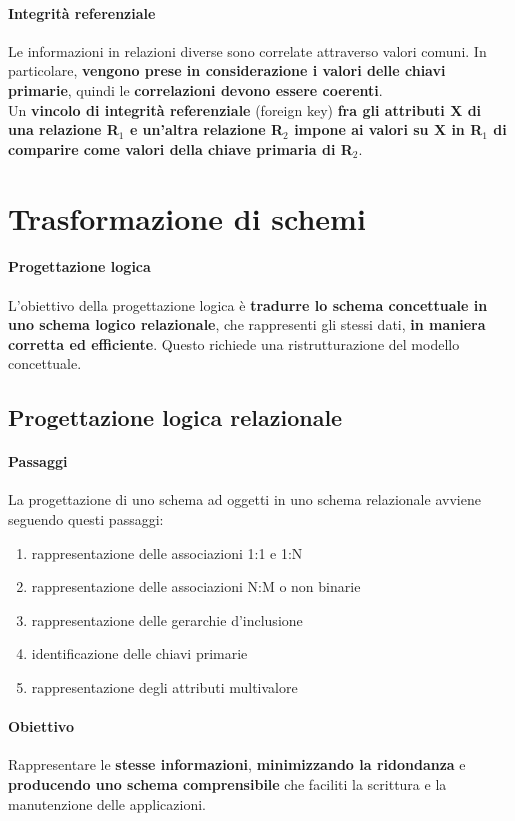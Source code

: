 \documentclass[10pt]{book}
\begin{document}
\paragraph{Integrità referenziale} Le informazioni in relazioni diverse sono correlate attraverso valori comuni. In particolare, \textbf{vengono prese in considerazione i valori delle chiavi primarie}, quindi le \textbf{correlazioni devono essere coerenti}.\\
Un \textbf{vincolo di integrità referenziale} (foreign key) \textbf{fra gli attributi X di una relazione R$_1$ e un'altra relazione R$_2$ impone ai valori su X in R$_1$ di comparire come valori della chiave primaria di R$_2$}.
\section{Trasformazione di schemi}
\paragraph{Progettazione logica} L'obiettivo della progettazione logica è \textbf{tradurre lo schema concettuale in uno schema logico relazionale}, che rappresenti gli stessi dati, \textbf{in maniera corretta ed efficiente}. Questo richiede una ristrutturazione del modello concettuale.
\subsection{Progettazione logica relazionale}
\paragraph{Passaggi} La progettazione di uno schema ad oggetti in uno schema relazionale avviene seguendo questi passaggi:
\begin{enumerate}
	\item rappresentazione delle associazioni 1:1 e 1:N
	\item rappresentazione delle associazioni N:M o non binarie
	\item rappresentazione delle gerarchie d'inclusione
	\item identificazione delle chiavi primarie
	\item rappresentazione degli attributi multivalore
\end{enumerate}
\paragraph{Obiettivo} Rappresentare le \textbf{stesse informazioni}, \textbf{minimizzando la ridondanza} e \textbf{producendo uno schema comprensibile} che faciliti la scrittura e la manutenzione delle applicazioni.
\end{document}
